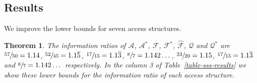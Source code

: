 \documentclass[11pt, a4paper]{kybernetika}
\newtheorem{theorem}{Theorem}[section]
\begin{document}
	
	\subsection{Results}\label{SSS:R}
	
	We improve the lower bounds for seven access structures.
	
	\begin{theorem}\label{thm:spanish-bounds}
		The information ratios of $\mathcal{A}$, $\mathcal{A}^*$, $\mathcal{F}$, $\mathcal{F}^*$, $\widehat{\mathcal{F}}$, $\mathcal{Q}$ and $\mathcal{Q}^*$ are $\sfrac{57}{50}=1.14$, $\sfrac{52}{45}=1.1\overline{5}$, $\sfrac{17}{15}=1.1\overline{3}$, $\sfrac87=1.142\dots$, $\sfrac{23}{20}=1.15$, $\sfrac{17}{15}=1.1\overline{3}$ and $\sfrac87=1.142\dots$ respectively. In the column 3 of Table~\ref{table-sss-results} we show these lower bounds for the information ratio of each access structure.
	\end{theorem}
	
\end{document}
